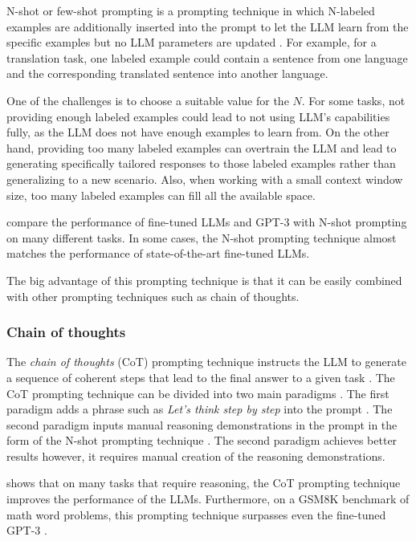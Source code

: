 N-shot or few-shot prompting is a prompting technique in which N-labeled examples are additionally inserted into the prompt to let the LLM learn from the specific examples but no LLM parameters are updated \cite{Brown2020}. For example, for a translation task, one labeled example could contain a sentence from one language and the corresponding translated sentence into another language.

One of the challenges is to choose a suitable value for the $N$. For some tasks, not providing enough labeled examples could lead to not using LLM's capabilities fully, as the LLM does not have enough examples to learn from. On the other hand, providing too many labeled examples can overtrain the LLM and lead to generating specifically tailored responses to those labeled examples rather than generalizing to a new scenario. Also, when working with a small context window size, too many labeled examples can fill all the available space.

\citet{Brown2020} compare the performance of fine-tuned LLMs and GPT-3 with N-shot prompting on many different tasks. In some cases, the N-shot prompting technique almost matches the performance of state-of-the-art fine-tuned LLMs.

The big advantage of this prompting technique is that it can be easily combined with other prompting techniques such as chain of thoughts.


\subsubsection{Chain of thoughts}
\label{sec:chain_of_thoughts}

The \emph{chain of thoughts} (CoT) prompting technique instructs the LLM to generate a sequence of coherent steps that lead to the final answer to a given task \cite{Wei2022}. The CoT prompting technique can be divided into two main paradigms \cite{Zhang2022}. The first paradigm adds a phrase such as \textit{Let's think step by step} into the prompt \cite{Kojima2022}. The second paradigm inputs manual reasoning demonstrations in the prompt in the form of the N-shot prompting technique \cite{Wei2022}. 
The second paradigm achieves better results \cite{Wei2022} however, it requires manual creation of the reasoning demonstrations.

\citet{Wei2022} shows that on many tasks that require reasoning, the CoT prompting technique improves the performance of the LLMs. Furthermore, on a GSM8K benchmark of math word problems, this prompting technique surpasses even the fine-tuned GPT-3 \cite{Wei2022}.

